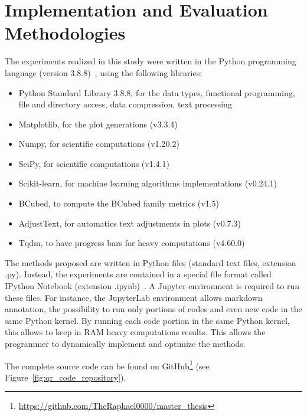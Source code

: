 \section{Implementation and Evaluation Methodologies}

The experiments realized in this study were written in the Python programming language (version 3.8.8)~\cite{python}, using the following libraries:

\begin{itemize}
  \item Python Standard Library 3.8.8, for the data types, functional programming, file and directory access, data compression, text processing \cite{python_standard_library}
  \item Matplotlib, for the plot generations (v3.3.4) \cite{matplotlib}
  \item Numpy, for scientific computations (v1.20.2) \cite{numpy}
  \item SciPy, for scientific computations (v1.4.1) \cite{scipy}
  \item Scikit-learn, for machine learning algorithms implementations (v0.24.1) \cite{sklearn}
  \item BCubed, to compute the BCubed family metrics (v1.5) \cite{bcubed_gh}
  \item AdjustText, for automatics text adjustments in plots (v0.7.3) \cite{adjustText}
  \item Tqdm, to have progress bars for heavy computations (v4.60.0) \cite{tqdm}
\end{itemize}

The methods proposed are written in Python files (standard text files, extension .py).
Instead, the experiments are contained in a special file format called IPython Notebook (extension .ipynb)~\cite{jupyter}.
A Jupyter environment is required to run these files.
For instance, the JupyterLab environment allows markdown annotation, the possibility to run only portions of codes and even new code in the same Python kernel.
By running each code portion in the same Python kernel, this allows to keep in RAM heavy computations results.
This allows the programmer to dynamically implement and optimize the methods.

The complete source code can be found on GitHub\footnote{\url{https://github.com/TheRaphael0000/master_thesis}} (see Figure~\ref{fig:qr_code_repository}).

